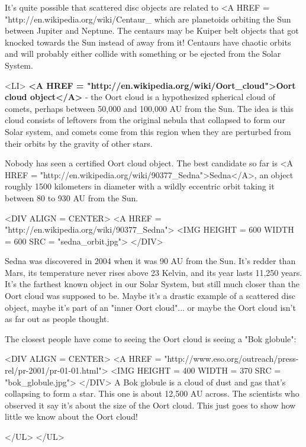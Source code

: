    It's quite possible that scattered disc objects are related to 
   <A HREF = "http://en.wikipedia.org/wiki/Centaur_%
   which are planetoids orbiting the Sun between Jupiter
   and Neptune.  The centaurs may be Kuiper belt objects that got
   knocked towards the Sun instead of away from it!  Centaurs have
   chaotic orbits and will probably either collide with something or
   be ejected from the Solar System.

<LI>
  \textbf{<A HREF = "http://en.wikipedia.org/wiki/Oort_cloud">Oort cloud object</A>} - the Oort cloud is a hypothesized spherical cloud
   of comets, perhaps between 50,000 and 100,000 AU from the Sun.  The idea 
   is this cloud consists of leftovers from the original nebula that
   collapsed to form our Solar system, and comets come from this region 
   when they are perturbed from their orbits by the gravity of other 
   stars.  
 
   Nobody has seen a certified Oort cloud object.  The best candidate
   so far is <A HREF = "http://en.wikipedia.org/wiki/90377_Sedna">Sedna</A>, 
   an object roughly 1500 kilometers in diameter with
   a wildly eccentric orbit taking it between 80 to 930 AU from the Sun.  

<DIV ALIGN = CENTER>
<A HREF = "http://en.wikipedia.org/wiki/90377_Sedna">
<IMG HEIGHT = 600 WIDTH = 600 SRC = "sedna_orbit.jpg">
</DIV>

   Sedna was discovered in 2004 when it was 90 AU from the Sun. 
   It's redder than Mars, its temperature never rises above 23 Kelvin,
   and its year lasts 11,250 years.  It's
   the farthest known object in our Solar System, but still much closer
   than the Oort cloud was supposed to be.  Maybe it's a drastic example
   of a scattered disc object, maybe it's part of an "inner Oort 
   cloud"... or maybe the Oort cloud isn't as far out as people thought.

   The closest people have come to seeing the Oort cloud is seeing
   a "Bok globule":  

<DIV ALIGN = CENTER>
<A HREF = "http://www.eso.org/outreach/press-rel/pr-2001/pr-01-01.html">
<IMG HEIGHT = 400 WIDTH = 370 SRC = "bok_globule.jpg">
</DIV>
    A Bok globule is a cloud of dust and gas that's collapsing to
    form a star.  This one is about 12,500 AU across.  The scientists
    who observed it say it's about the size of the Oort cloud.  This
    just goes to show how little we know about the Oort cloud!
   
</UL>
</UL>

